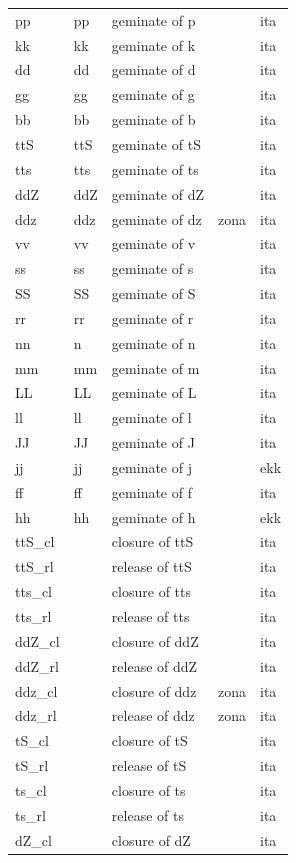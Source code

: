 \documentclass[twoside,a4paper]{book}
\begin{document}
\begin{longtable}{lllll}
	pp & pp & geminate of p & & ita\\
	kk & kk & geminate of k & & ita\\
	dd & dd & geminate of d & & ita\\
	gg & gg & geminate of g & & ita\\
	bb & bb & geminate of b & & ita\\
	ttS & ttS & geminate of tS & & ita\\
	tts & tts & geminate of ts & & ita\\
	ddZ & ddZ & geminate of dZ & & ita\\
	ddz & ddz & geminate of dz & zona & ita\\
	vv & vv & geminate of v & & ita\\
	ss & ss & geminate of s & & ita\\
	SS & SS & geminate of S & & ita\\
	rr & rr & geminate of r & & ita\\
	nn & n & geminate of n & & ita\\
	mm & mm & geminate of m & & ita\\
	LL & LL & geminate of L & & ita\\
	ll & ll & geminate of l & & ita\\
	JJ & JJ & geminate of J & & ita\\
	jj & jj & geminate of j & & ekk\\
	ff & ff & geminate of f & & ita\\
	hh & hh & geminate of h & & ekk\\
	ttS\_cl & & closure of ttS & & ita\\
	ttS\_rl & & release of ttS & & ita\\
	tts\_cl & & closure of tts & & ita\\
	tts\_rl & & release of tts & & ita\\
	ddZ\_cl & & closure of ddZ & & ita\\
	ddZ\_rl & & release of ddZ & & ita\\
	ddz\_cl & & closure of ddz & zona & ita\\
	ddz\_rl & & release of ddz & zona & ita\\
	tS\_cl & & closure of tS & & ita\\
	tS\_rl & & release of tS & & ita\\
	ts\_cl & & closure of ts & & ita\\
	ts\_rl & & release of ts & & ita\\
	dZ\_cl & & closure of dZ & & ita\\

\end{longtable}
\end{document}
